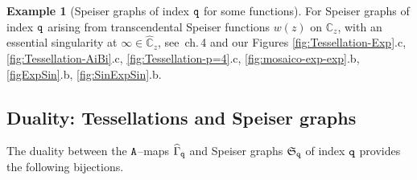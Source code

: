 \documentclass[final,3p,times]{elsarticle}
\newcommand{\CC}{\ensuremath{{\mathbb C}}}
\newcommand{\CW}{\ensuremath{{\widehat{\mathbb C}}}}
\theoremstyle{definition}
\newtheorem{example}{Example}[section]
\begin{document}
\begin{example}[Speiser graphs of index $\tt q$ for some functions]
For Speiser graphs of index $\tt q$ arising from transcendental Speiser functions $w(z)$ 
on $\CC_z$, with an essential singularity at $\infty\in\CW_z$,
see
\cite{GoldbergOstrovskii}\,ch.\,4  and 
our Figures 
\ref{fig:Tessellation-Exp}.c,
\ref{fig:Tessellation-AiBi}.c, 
\ref{fig:Tessellation-p=4}.c,
\ref{fig:mosaico-exp-exp}.b, 
\ref{figExpSin}.b, 
\ref{fig:SinExpSin}.b.
\end{example}

\subsection{Duality: Tessellations and Speiser graphs}
\label{sec:graph-results}
The duality between the $\tt A$--maps $\widehat{\Gamma}_{\tt q}$ 
and Speiser graphs $\mathfrak{S}_{\tt q}$ of index $\tt q$ provides the following bijections.
\end{document}
